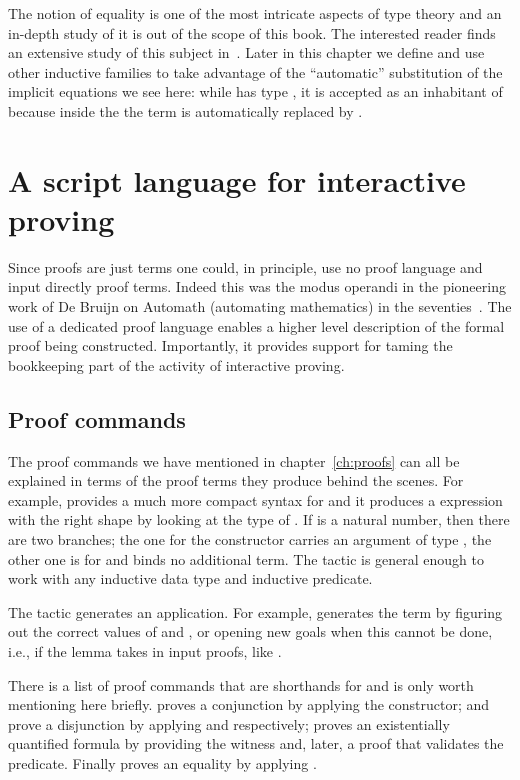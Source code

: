 The notion of equality is one of the most intricate aspects of type
theory and an in-depth study of it is out of the scope of this book.  The interested reader
finds an extensive study of this subject in~\cite{hottbook}.  Later in this
chapter we define and use other inductive families to take advantage
of the ``automatic'' substitution of the implicit equations we see here:
while  has type , it is accepted as an
inhabitant of  because inside the  the term 
is automatically replaced by .

\section{A script language for interactive proving}


Since proofs are just terms one could,
in principle, use no proof language and input directly proof terms.
Indeed this was the modus operandi in the pioneering work of
De Bruijn on Automath (automating mathematics) in the seventies~\cite{nederpelt-94}.
The use of a dedicated proof language enables a higher level
description of the formal proof being constructed. Importantly, it
provides support for taming the bookkeeping part of the activity of
interactive proving.

\subsection{Proof commands}
  The proof commands we have mentioned in chapter~\ref{ch:proofs} can all be
explained in terms of the proof terms they produce behind the scenes.
For example,  provides a much more compact syntax
for  and it produces a
 expression with the right
shape by looking at the type of .  If  is a natural number, then there
are two branches; the one for the  constructor carries an argument of type
, the other one is for  and binds no additional term.
The  tactic is general enough to work with any inductive data type
and inductive predicate.

The  tactic generates an application.  For example, 
generates the term  by figuring out the correct values of
 and , or opening new goals when this cannot be done, i.e.,
if the lemma takes in input proofs, like .

There is a list of proof commands that are shorthands for 
and is only worth mentioning here briefly.  proves a conjunction
by applying the  constructor;  and  prove a
disjunction by applying  and  respectively;
 proves an existentially quantified formula by providing
the witness  and, later, a proof that  validates the predicate.
Finally  proves an equality by applying .

